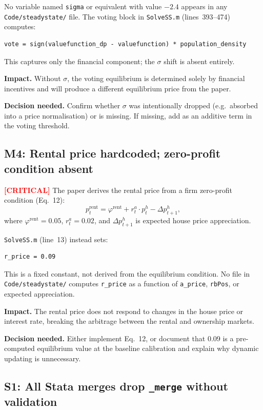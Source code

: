 \documentclass[11pt]{article}
\newcommand{\critical}{\textcolor{red}{\textbf{[CRITICAL]}}}
\begin{document}
No variable named \texttt{sigma} or equivalent with value $-2.4$ appears in any
\texttt{Code/steadystate/} file. The voting block in \texttt{SolveSS.m}
(lines~393--474) computes:
\begin{verbatim}
vote = sign(valuefunction_dp - valuefunction) * population_density
\end{verbatim}
This captures only the financial component; the $\sigma$ shift is absent entirely.

\noindent\textbf{Impact.} Without $\sigma$, the voting equilibrium is determined
solely by financial incentives and will produce a different equilibrium price from the paper.

\noindent\textbf{Decision needed.} Confirm whether $\sigma$ was intentionally dropped
(e.g.\ absorbed into a price normalisation) or is missing. If missing, add as an additive
term in the voting threshold.

\subsection*{M4: Rental price hardcoded; zero-profit condition absent}

\critical{} The paper derives the rental price from a firm zero-profit condition (Eq.~12):
\[
  p_t^{\mathrm{rent}} = \varphi^{\mathrm{rent}} + r_t^a \cdot p_t^h - \Delta p_{t+1}^h,
\]
where $\varphi^{\mathrm{rent}} = 0.05$, $r_t^a = 0.02$, and $\Delta p_{t+1}^h$
is expected house price appreciation.

\texttt{SolveSS.m} (line~13) instead sets:
\begin{verbatim}
r_price = 0.09
\end{verbatim}
This is a fixed constant, not derived from the equilibrium condition. No file in
\texttt{Code/steadystate/} computes \texttt{r\_price} as a function of
\texttt{a\_price}, \texttt{rbPos}, or expected appreciation.

\noindent\textbf{Impact.} The rental price does not respond to changes in the house price
or interest rate, breaking the arbitrage between the rental and ownership markets.

\noindent\textbf{Decision needed.} Either implement Eq.~12, or document that 0.09 is
a pre-computed equilibrium value at the baseline calibration and explain why dynamic
updating is unnecessary.

\subsection*{S1: All Stata merges drop \texttt{\_merge} without validation}
\end{document}
